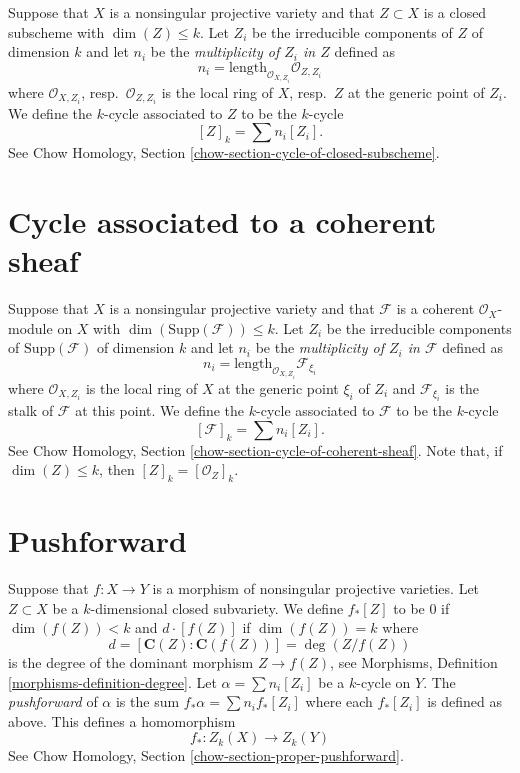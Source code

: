 \noindent
Suppose that $X$ is a nonsingular projective variety and that $Z \subset X$
is a closed subscheme with $\dim(Z) \leq k$. Let $Z_i$ be the irreducible
components of $Z$ of dimension $k$ and let $n_i$ be the
{\it multiplicity of $Z_i$ in $Z$} defined as
$$
n_i = \text{length}_{\mathcal{O}_{X, Z_i}} \mathcal{O}_{Z, Z_i}
$$
where $\mathcal{O}_{X, Z_i}$, resp.\ $\mathcal{O}_{Z, Z_i}$ is the
local ring of $X$, resp.\ $Z$ at the generic point of $Z_i$.
We define the $k$-cycle associated to $Z$ to be the $k$-cycle
$$
[Z]_k = \sum n_i [Z_i].
$$
See Chow Homology, Section \ref{chow-section-cycle-of-closed-subscheme}.


\section{Cycle associated to a coherent sheaf}
\label{section-cycle-of-coherent-sheaf}

\noindent
Suppose that $X$ is a nonsingular projective variety and that $\mathcal{F}$
is a coherent $\mathcal{O}_X$-module on $X$ with
$\dim(\text{Supp}(\mathcal{F})) \leq k$.
Let $Z_i$ be the irreducible components of $\text{Supp}(\mathcal{F})$
of dimension $k$ and let $n_i$ be the
{\it multiplicity of $Z_i$ in $\mathcal{F}$} defined as
$$
n_i = \text{length}_{\mathcal{O}_{X, Z_i}} \mathcal{F}_{\xi_i}
$$
where $\mathcal{O}_{X, Z_i}$ is the
local ring of $X$ at the generic point $\xi_i$ of $Z_i$
and $\mathcal{F}_{\xi_i}$ is the stalk of $\mathcal{F}$ at this point.
We define the $k$-cycle associated to $\mathcal{F}$ to be the $k$-cycle
$$
[\mathcal{F}]_k = \sum n_i [Z_i].
$$
See Chow Homology, Section \ref{chow-section-cycle-of-coherent-sheaf}.
Note that, if $\dim(Z) \leq k$, then $[Z]_k = [\mathcal{O}_Z]_k$.


\section{Pushforward}
\label{section-pushforward}

\noindent
Suppose that $f : X \to Y$ is a morphism of nonsingular projective varieties.
Let $Z \subset X$ be a $k$-dimensional
closed subvariety. We define $f_*[Z]$ to be $0$ if $\dim(f(Z))<k$
and $d \cdot [f(Z)]$ if $\dim(f(Z)) = k$ where
$$
d = [\mathbf{C}(Z) : \mathbf{C}(f(Z))] = \deg(Z/f(Z))
$$
is the degree of the dominant morphism $Z \to f(Z)$, see
Morphisms, Definition \ref{morphisms-definition-degree}.
Let $\alpha = \sum n_i [Z_i]$ be a $k$-cycle on $Y$. The
{\it pushforward} of $\alpha$ is the sum $f_* \alpha = \sum n_i f_*[Z_i]$
where each $f_*[Z_i]$ is defined as above. This defines a homomorphism
$$
f_* : Z_k(X) \longrightarrow Z_k(Y)
$$
See Chow Homology, Section \ref{chow-section-proper-pushforward}.


